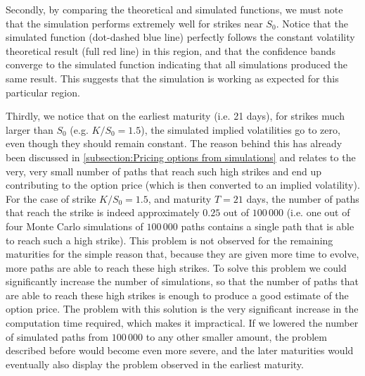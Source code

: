 Secondly, by comparing the theoretical and simulated functions, we must note that the simulation performs extremely well for strikes near $S_0$. Notice that the simulated function (dot-dashed blue line) perfectly follows the constant volatility theoretical result (full red line) in this region, and that the confidence bands converge to the simulated function indicating that all simulations produced the same result. This suggests that the simulation is working as expected for this particular region.

Thirdly, we notice that on the earliest maturity (i.e. 21 days), for strikes much larger than $S_0$ (e.g. $K/S_0=1.5$), the simulated implied volatilities go to zero, even though they should remain constant. The reason behind this has already been discussed in \autoref{subsection:Pricing options from simulations} and relates to the very, very small number of paths that reach such high strikes and end up contributing to the option price (which is then converted to an implied volatility). For the case of strike $K/S_0=1.5$, and maturity $T=21$ days, the number of paths that reach the strike is indeed approximately $0.25$ out of $100\,000$ (i.e. one out of four Monte Carlo simulations of $100\,000$ paths contains a single path that is able to reach such a high strike). This problem is not observed for the remaining maturities for the simple reason that, because they are given more time to evolve, more paths are able to reach these high strikes.
To solve this problem we could significantly increase the number of simulations, so that the number of paths that are able to reach these high strikes is enough to produce a good estimate of the option price. The problem with this solution is the very significant increase in the computation time required, which makes it impractical.
If we lowered the number of simulated paths from $100\,000$ to any other smaller amount, the problem described before would become even more severe, and the later maturities would eventually also display the problem observed in the earliest maturity.

